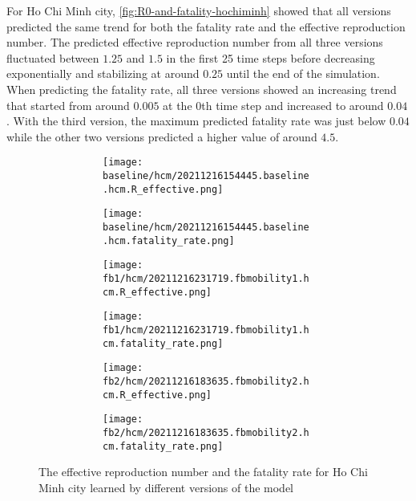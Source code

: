 For Ho Chi Minh city, \autoref{fig:R0-and-fatality-hochiminh} showed that all versions predicted the same trend for both the fatality rate and the effective reproduction number.
The predicted effective reproduction number from all three versions fluctuated between $1.25$ and $1.5$ in the first 25 time steps before decreasing exponentially and stabilizing at around $0.25$ until the end of the simulation.
When predicting the fatality rate, all three versions showed an increasing trend that started from around $0.005$ at the 0th time step and increased to around $0.04$.
With the third version, the maximum predicted fatality rate was just below $0.04$ while the other two versions predicted a higher value of around $4.5$.

\begin{figure}[!htb]
    \centering

    \begin{subfigure}[b]{\linewidth}
        \centering
        \begin{subfigure}[b]{0.4\linewidth}
            \texttt{[image: baseline/hcm/20211216154445.baseline.hcm.R\_effective.png]}
        \end{subfigure}
        \begin{subfigure}[b]{0.4\linewidth}
            \texttt{[image: baseline/hcm/20211216154445.baseline.hcm.fatality\_rate.png]}
        \end{subfigure}
    \end{subfigure}

    \begin{subfigure}[b]{\linewidth}
        \centering
        \begin{subfigure}[b]{0.4\linewidth}
            \texttt{[image: fb1/hcm/20211216231719.fbmobility1.hcm.R\_effective.png]}
        \end{subfigure}
        \begin{subfigure}[b]{0.4\linewidth}
            \texttt{[image: fb1/hcm/20211216231719.fbmobility1.hcm.fatality\_rate.png]}
        \end{subfigure}
    \end{subfigure}

    \begin{subfigure}[b]{\linewidth}
        \centering
        \begin{subfigure}[b]{0.4\linewidth}
            \texttt{[image: fb2/hcm/20211216183635.fbmobility2.hcm.R\_effective.png]}
        \end{subfigure}
        \begin{subfigure}[b]{0.4\linewidth}
            \texttt{[image: fb2/hcm/20211216183635.fbmobility2.hcm.fatality\_rate.png]}
        \end{subfigure}
    \end{subfigure}

    \caption{The effective reproduction number and the fatality rate for Ho Chi Minh city learned by different versions of the model}
    \label{fig:R0-and-fatality-hochiminh}
\end{figure}

